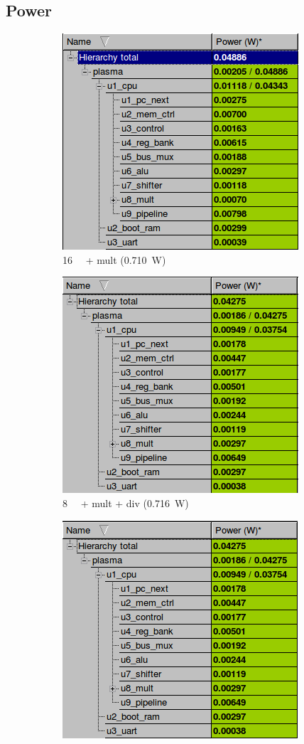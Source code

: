 \documentclass[final]{article}
\begin{document}
\subsection{Power}
\begin{figure}[H]
\centering
\begin{subfigure}{.5\textwidth}
  \centering
  \includegraphics[width=.6\linewidth]{resources/power16mult}
  \caption{\SI{16}{\kibi\byte} + mult (\SI{0.710}{\watt})}
  \label{fig:16multpower}
\end{subfigure}%
\begin{subfigure}{.5\textwidth}
  \centering
  \includegraphics[width=.6\linewidth]{resources/power8multdiv}
  \caption{\SI{8}{\kibi\byte} + mult + div (\SI{0.716}{\watt})}
  \label{fig:8multdivpower}
\end{subfigure}
\begin{subfigure}{.5\textwidth}
  \centering
  \includegraphics[width=.6\linewidth]{resources/power16multdiv}

\end{subfigure}
\end{figure}
\end{document}
